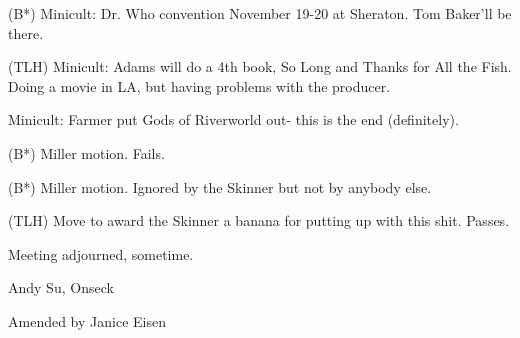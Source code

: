 \documentclass[12pt]{article}
\begin{document}
(B*) Minicult: Dr. Who convention November 19-20 at Sheraton. Tom Baker'll be there.

(TLH) Minicult: Adams will do a 4th book, So Long and Thanks for All the Fish. Doing a movie in LA, but having problems with the producer.

Minicult: Farmer put Gods of Riverworld out- this is the end (definitely).

(B*) Miller motion. Fails.

(B*) Miller motion. Ignored by the Skinner but not by anybody else.

(TLH) Move to award the Skinner a banana for putting up with this shit. Passes.

\vspace{12pt}

\noindent
Meeting adjourned, sometime.

\vspace{18pt}

\centerline{Andy Su, Onseck}
\centerline{Amended by Janice Eisen}
\end{document}

